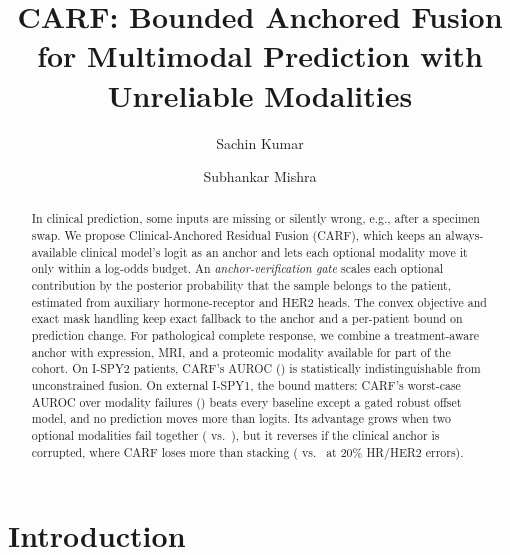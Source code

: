 \documentclass[a4paper,runningheads]{llncs}
\begin{document}
\title{CARF: Bounded Anchored Fusion for Multimodal Prediction with Unreliable Modalities}
\author{Sachin Kumar \and
Subhankar Mishra}

\maketitle

\begin{abstract}
In clinical prediction, some inputs are missing or silently wrong, e.g., after a specimen swap. We propose Clinical-Anchored Residual Fusion (CARF), which keeps an always-available clinical model's logit as an anchor and lets each optional modality move it only within a log-odds budget. An \emph{anchor-verification gate} scales each optional contribution by the posterior probability that the sample belongs to the patient, estimated from auxiliary hormone-receptor and HER2 heads. The convex objective and exact mask handling keep exact fallback to the anchor and a per-patient bound on prediction change. For pathological complete response, we combine a treatment-aware anchor with expression, MRI, and a proteomic modality available for part of the cohort. On \NDev{} I-SPY2 patients, CARF's AUROC (\IntCarfTwo{}) is statistically indistinguishable from unconstrained fusion. On external I-SPY1, the bound matters: CARF's worst-case AUROC over modality failures (\ExtWorstCarfTwo{}) beats every baseline except a gated robust offset model, and no prediction moves more than \MaxDispCarfTwo{} logits. Its advantage grows when two optional modalities fail together (\ComboSwapSwapCarf{} vs.\ \ComboSwapSwapRobustOffsetLr{}), but it reverses if the clinical anchor is corrupted, where CARF loses more than stacking (\AnchorBothTwoZeroCarf{} vs.\ \AnchorBothTwoZeroStack{} at 20\% HR/HER2 errors).
\end{abstract}

\section{Introduction}
\end{document}
